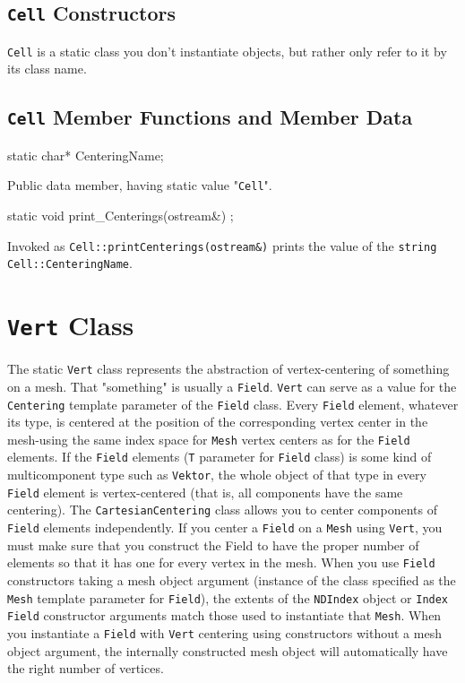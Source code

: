 \subsection{\texttt{Cell} Constructors}
\texttt{Cell} is a static class you don't instantiate objects, but rather only refer to it by its class name. 

\subsection{\texttt{Cell} Member Functions and Member Data}

\begin{smallcode}
static char* CenteringName; 
\end{smallcode}
Public data member, having static value "\texttt{Cell}".
 
\begin{smallcode}
static void print_Centerings(ostream&) ;
\end{smallcode}
Invoked as \texttt{Cell::printCenterings(ostream\&)}  prints the value of the \texttt{string Cell::CenteringName}. 

\section{\texttt{Vert} Class}
The static \texttt{Vert} class represents the abstraction of vertex-centering of something on a mesh. 
That "something" is usually a \texttt{Field}. \texttt{Vert} can serve as a value for the \texttt{Centering} template parameter of the \texttt{Field} class. Every \texttt{Field} element, whatever its type, 
is centered at the position of the corresponding vertex center in the mesh-using the same index space for \texttt{Mesh} vertex centers as for the \texttt{Field} elements. If the \texttt{Field} elements 
(\texttt{T} parameter for \texttt{Field} class) is some kind of multicomponent type such as \texttt{Vektor}, the whole object of that type in every \texttt{Field} element is vertex-centered 
(that is, all components have the same centering). The \texttt{CartesianCentering} class allows you to center components of \texttt{Field} elements independently. 
If you center a \texttt{Field} on a \texttt{Mesh} using \texttt{Vert}, you must make sure that you construct the Field to have the proper number of elements so that it has one for every vertex in the mesh. 
When you use \texttt{Field} constructors taking a mesh object argument (instance of the class specified as the \texttt{Mesh} template parameter for \texttt{Field}), the extents of the \texttt{NDIndex} object or \texttt{Index} 
\texttt{Field} constructor arguments match those used to instantiate that \texttt{Mesh}. When you instantiate a \texttt{Field} with \texttt{Vert} centering using constructors without a mesh object argument, 
the internally constructed mesh object will automatically have the right number of vertices. 

